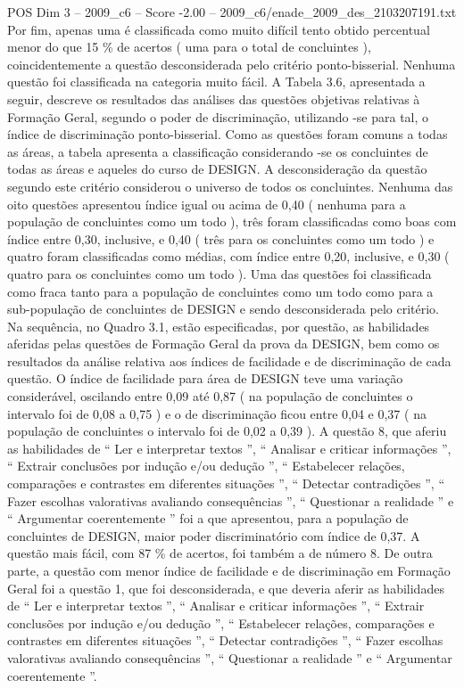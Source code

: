 \begin{textsample}{POS Dim 3 – 2009\_c6 – Score -2.00 – 2009\_c6/enade\_2009\_des\_2103207191.txt}
Por fim, apenas uma é classificada como muito difícil tento obtido percentual menor do que 15 \% de acertos ( uma para o total de concluintes ), coincidentemente a questão desconsiderada pelo critério ponto-bisserial.
Nenhuma questão foi classificada na categoria muito fácil.
A Tabela 3.6, apresentada a seguir, descreve os resultados das análises das questões objetivas relativas à Formação Geral, segundo o poder de discriminação, utilizando -se para tal, o índice de discriminação ponto-bisserial.
Como as questões foram comuns a todas as áreas, a tabela apresenta a classificação considerando -se os concluintes de todas as áreas e aqueles do curso de DESIGN.
A desconsideração da questão segundo este critério considerou o universo de todos os concluintes.
Nenhuma das oito questões apresentou índice igual ou acima de 0,40 ( nenhuma para a população de concluintes como um todo ), três foram classificadas como boas com índice entre 0,30, inclusive, e 0,40 ( três para os concluintes como um todo ) e quatro foram classificadas como médias, com índice entre 0,20, inclusive, e 0,30 ( quatro para os concluintes como um todo ).
Uma das questões foi classificada como fraca tanto para a população de concluintes como um todo como para a sub-população de concluintes de DESIGN e sendo desconsiderada pelo critério.
Na sequência, no Quadro 3.1, estão especificadas, por questão, as habilidades aferidas pelas questões de Formação Geral da prova da DESIGN, bem como os resultados da análise relativa aos índices de facilidade e de discriminação de cada questão.
O índice de facilidade para área de DESIGN teve uma variação considerável, oscilando entre 0,09 até 0,87 ( na população de concluintes o intervalo foi de 0,08 a 0,75 ) e o de discriminação ficou entre 0,04 e 0,37 ( na população de concluintes o intervalo foi de 0,02 a 0,39 ).
A questão 8, que aferiu as habilidades de “ Ler e interpretar textos ”, “ Analisar e criticar informações ”, “ Extrair conclusões por indução e/ou dedução ”, “ Estabelecer relações, comparações e contrastes em diferentes situações ”, “ Detectar contradições ”, “ Fazer escolhas valorativas avaliando consequências ”, “ Questionar a realidade ” e “ Argumentar coerentemente ” foi a que apresentou, para a população de concluintes de DESIGN, maior poder discriminatório com índice de 0,37.
A questão mais fácil, com 87 \% de acertos, foi também a de número 8.
De outra parte, a questão com menor índice de facilidade e de discriminação em Formação Geral foi a questão 1, que foi desconsiderada, e que deveria aferir as habilidades de “ Ler e interpretar textos ”, “ Analisar e criticar informações ”, “ Extrair conclusões por indução e/ou dedução ”, “ Estabelecer relações, comparações e contrastes em diferentes situações ”, “ Detectar contradições ”, “ Fazer escolhas valorativas avaliando consequências ”, “ Questionar a realidade ” e “ Argumentar coerentemente ”.

\end{textsample}
